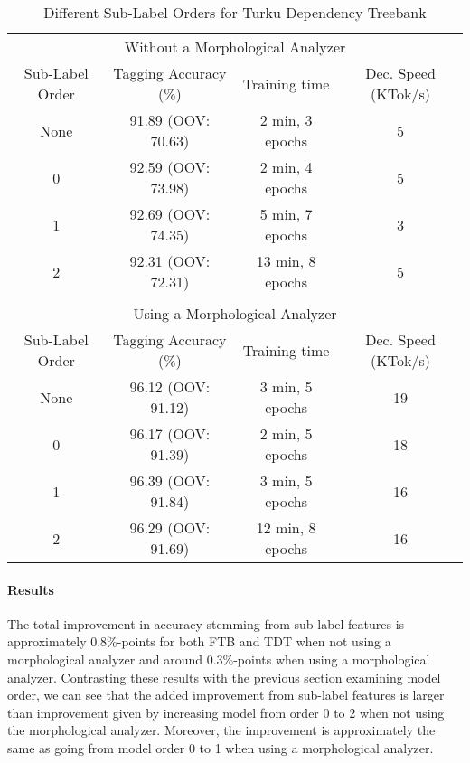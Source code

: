 \begin{table}[htb!]
\begin{center}
\begin{tabular}{cccc}
\multicolumn{4}{c}{Without a Morphological Analyzer}\\
Sub-Label Order & Tagging Accuracy (\%) & Training time    & Dec. Speed (KTok/s)\\
\hline
None            & 91.89 (OOV: 70.63)    & 2 min, 3 epochs  & 5                       \\
0               &  92.59 (OOV: 73.98)   & 2 min, 4 epochs  & 5                       \\
1               &  92.69 (OOV: 74.35)   & 5 min, 7 epochs  & 3                       \\
2               &  92.31 (OOV: 72.31)   & 13 min, 8 epochs  & 5                       \\
                &                       &                  &                          \\
\multicolumn{4}{c}{Using a Morphological Analyzer}\\
Sub-Label Order & Tagging Accuracy (\%) & Training time    & Dec. Speed (KTok/s)\\
\hline
None            &  96.12 (OOV: 91.12)   & 3 min, 5 epochs  & 19                       \\
0               &  96.17 (OOV: 91.39)   & 2 min, 5 epochs  & 18                       \\
1               &  96.39 (OOV: 91.84)   & 3 min, 5 epochs  & 16                       \\
2               &  96.29 (OOV: 91.69)   & 12 min, 8 epochs  & 16                       \\
\end{tabular}
\caption{Different Sub-Label Orders for Turku Dependency Treebank}\label{tab:tdt-sl-res}
\end{center}
\end{table}


\paragraph{Results} The total improvement in accuracy stemming from
sub-label features is approximately 0.8\%-points for both FTB and TDT
when not using a morphological analyzer and around 0.3\%-points when
using a morphological analyzer. Contrasting these results with the
previous section examining model order, we can see that the added
improvement from sub-label features is larger than improvement given
by increasing model from order 0 to 2 when not using the morphological
analyzer. Moreover, the improvement is approximately
the same as going from model order 0 to 1 when using a morphological
analyzer.

